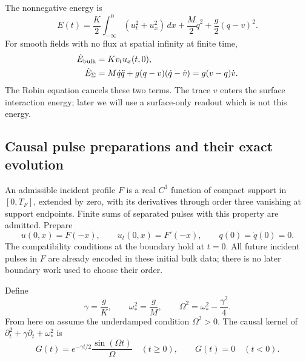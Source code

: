 \documentclass[11pt,a4paper]{article}
\theoremstyle{remark}
\begin{document}
The nonnegative energy is
\begin{equation}
 E(t)=\frac K2\int_{-\infty}^0(u_t^2+u_x^2)\,dx
       +\frac M2\dot q^2+\frac g2(q-v)^2.
 \label{eq:energy}
\end{equation}
For smooth fields with no flux at spatial infinity at finite time,
\begin{align*}
 \dot E_{\rm bulk}&=K v_t u_x(t,0),\\
 \dot E_\Sigma&=M\dot q\ddot q+g(q-v)(\dot q-\dot v)
              =g(v-q)\dot v.
\end{align*}
The Robin equation cancels these two terms. The trace $v$ enters the
surface interaction energy; later we will use a surface-only readout
which is not this energy.

\subsection{Causal pulse preparations and their exact evolution}

An admissible incident profile $F$ is a real $C^3$ function of compact
support in $[0,T_F]$, extended by zero, with its derivatives through order
three vanishing at support endpoints. Finite sums of separated pulses
with this property are admitted. Prepare
\begin{equation}
 u(0,x)=F(-x),\qquad u_t(0,x)=F'(-x),\qquad q(0)=\dot q(0)=0.
 \label{eq:initial}
\end{equation}
The compatibility conditions at the boundary hold at $t=0$. All future
incident pulses in $F$ are already encoded in these initial bulk data;
there is no later boundary work used to choose their order.

Define
\begin{equation}
 \gamma=\frac gK,\qquad \omega_*^2=\frac gM,
 \qquad \Omega^2=\omega_*^2-\frac{\gamma^2}{4}.
 \label{eq:parameters}
\end{equation}
From here on assume the underdamped condition $\Omega^2>0$. The causal
kernel of $\partial_t^2+\gamma\partial_t+\omega_*^2$ is
\begin{equation}
 G(t)=e^{-\gamma t/2}\frac{\sin(\Omega t)}{\Omega}\quad(t\ge0),
 \qquad G(t)=0\quad(t<0).
 \label{eq:kernel}
\end{equation}
\end{document}
